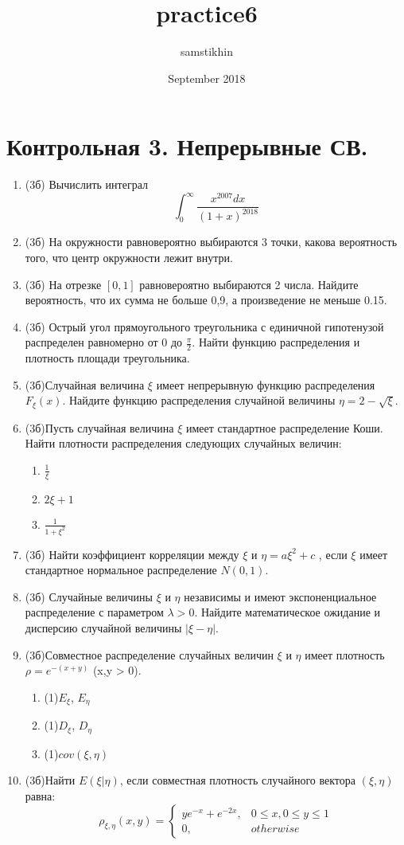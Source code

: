 \documentclass[a4paper, 14pt]{extarticle}
\title{practice6}
\author{samstikhin}
\date{September 2018}
\begin{document}
\section*{Контрольная 3. Непрерывные СВ.}
\begin{enumerate}
\item (3б) Вычислить интеграл
$$\int_0^{\infty} \frac{x^{2007}dx}{(1+x)^{2018}}$$
\item (3б) На окружности равновероятно выбираются 3 точки, какова вероятность того, что центр окружности лежит внутри.
\item (3б) На отрезке $[0,1]$ равновероятно выбираются 2 числа. Найдите вероятность, что их сумма не больше 0,9, а произведение не меньше 0.15.
\item (3б) Острый угол прямоугольного треугольника с единичной гипотенузой распределен равномерно от 0 до $\frac{\pi}{2}$. 
Найти функцию распределения и плотность площади треугольника.
\item (3б)Случайная величина $\xi$ имеет непрерывную функцию распределения $F_{\xi}(x)$. 
Найдите функцию распределения случайной величины $\eta=2-\sqrt{\xi}$.
\item (3б)Пусть случайная величина $\xi$ имеет стандартное распределение
Коши. Найти плотности распределения следующих случайных величин:
\begin{enumerate}
\item $\frac{1}{\xi}$
\item $2\xi + 1$
\item $\frac{1}{1+\xi^2}$
\end{enumerate}
\item (3б) Найти коэффициент корреляции между $\xi$ и $\eta = a\xi^2 + c$ , если 
$\xi$ имеет стандартное нормальное распределение $N(0,1)$.
\item (3б) Случайные величины $\xi$ и $\eta$
независимы и имеют экспоненциальное распределение с параметром
$\lambda>0$. Найдите математическое ожидание и дисперсию случайной величины
$|\xi - \eta|$.


\item (3б)Совместное распределение случайных величин $\xi$ и $\eta$ имеет плотность 
$\rho = e^{-(x+y)}$ (x,y > 0). 
\begin{enumerate}
\item (1)$E_{\xi}$, $E_{\eta}$
\item (1)$D_{\xi}$, $D_{\eta}$
\item (1)$cov(\xi,\eta)$
\end{enumerate}

\item (3б)Найти $E(\xi|\eta)$, если совместная плотность случайного вектора
$(\xi, \eta)$ равна:
	$$\rho_{\xi,\eta}(x,y) =\left\{
	\begin{array}{cc}
	ye^{-x}+e^{-2x}, & 0\leq x, 0\leq y\leq 1 \\
	0, & otherwise
\end{array}\right.$$





\end{enumerate}
\end{document}
